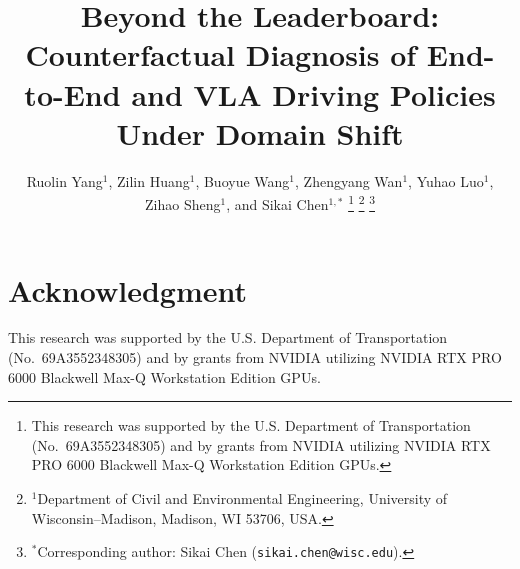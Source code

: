\documentclass[letterpaper, 10pt, conference]{ieeeconf}
\begin{document}
\title{\LARGE \bf Beyond the Leaderboard: Counterfactual Diagnosis of End-to-End and VLA Driving Policies Under Domain Shift}
\newif\ifanon \anonfalse
\ifanon
\author{Anonymous authors\\ Paper ID ---}
\else
\author{Ruolin Yang$^{1}$, Zilin Huang$^{1}$, Buoyue Wang$^{1}$, Zhengyang Wan$^{1}$, Yuhao Luo$^{1}$, Zihao Sheng$^{1}$, and Sikai Chen$^{1,*}$%
\thanks{This research was supported by the U.S. Department of Transportation (No.\ 69A3552348305) and by grants from NVIDIA utilizing NVIDIA RTX PRO 6000 Blackwell Max-Q Workstation Edition GPUs.}%
\thanks{$^{1}$Department of Civil and Environmental Engineering, University of Wisconsin--Madison, Madison, WI 53706, USA.}%
\thanks{$^{*}$Corresponding author: Sikai Chen ({\tt\small sikai.chen@wisc.edu}).}%
}
\fi
\maketitle
\thispagestyle{empty}
\pagestyle{empty}










\ifanon\else
\section*{Acknowledgment}
This research was supported by the U.S. Department of Transportation (No.\ 69A3552348305) and by grants from NVIDIA utilizing NVIDIA RTX PRO 6000 Blackwell Max-Q Workstation Edition GPUs.
\fi


\end{document}
